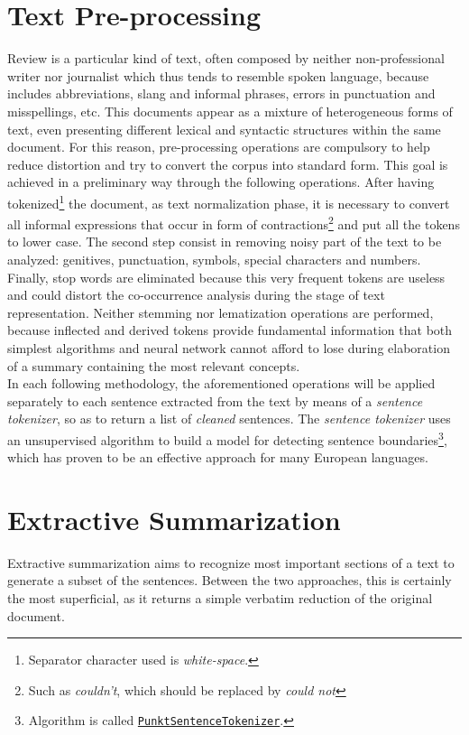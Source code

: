 \documentclass[fleqn,10pt]{SelfArx} %
\begin{document}
\section{Text Pre-processing}
Review is a particular kind of text, often composed by neither non-professional writer nor journalist which thus tends to resemble spoken language, because includes abbreviations, slang and informal phrases, errors in punctuation and misspellings, etc. This documents appear as a mixture of heterogeneous forms of text, even presenting different lexical and syntactic structures within the same document. For this reason, pre-processing operations are compulsory to help reduce distortion and try to convert the corpus into standard form. This goal is achieved in a preliminary way through the following operations. After having tokenized\footnote{Separator character used is \textit{white-space}.} the document, as text normalization phase, it is necessary to convert all informal expressions that occur in form of contractions\footnote{Such as \textit{couldn't}, which should be replaced by \textit{could not}} and put all the tokens to lower case. The second step consist in removing noisy part of the text to be analyzed: genitives, punctuation, symbols, special characters and numbers. Finally, stop words are eliminated because this very frequent tokens are useless and could distort the co-occurrence analysis during the stage of text representation. Neither stemming nor lematization operations are performed, because inflected and derived tokens provide fundamental information that both simplest algorithms and neural network cannot afford to lose during elaboration of a summary containing the most relevant concepts.\\
In each following methodology, the aforementioned operations will be applied separately to each sentence extracted from the text by means of a \textit{sentence tokenizer}, so as to return a list of \textit{cleaned} sentences. The \textit{sentence tokenizer} uses an unsupervised algorithm to build a model for detecting sentence boundaries\footnote{Algorithm is called \href{https://www.nltk.org/_modules/nltk/tokenize/punkt.html}{\texttt{PunktSentenceTokenizer}}.}, which has proven to be an effective approach for many European languages.
\section{Extractive Summarization}
Extractive summarization aims to recognize most important sections of a text to generate a subset of the sentences. Between the two approaches, this is certainly the most superficial, as it returns a simple verbatim reduction of the original document.
\end{document}
